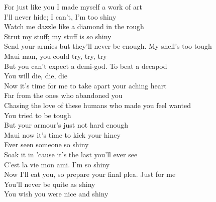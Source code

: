For just like you I made myself a work of art\\
I'll never hide; I can't, I'm too shiny\\
Watch me dazzle like a diamond in the rough\\
Strut my stuff; my stuff is so shiny\\
Send your armies but they'll never be enough. My shell's too tough\\
Maui man, you could try, try, try\\
But you can't expect a demi-god. To beat a decapod \\
You will die, die, die\\
Now it's time for me to take apart your aching heart\\
Far from the ones who abandoned you\\
Chasing the love of these humans who made you feel wanted\\
You tried to be tough\\
But your armour's just not hard enough\\
Maui now it's time to kick your hiney\\
Ever seen someone so shiny\\
Soak it in 'cause it's the last you'll ever see\\
C'est la vie mon ami. I'm so shiny\\
Now I'll eat you, so prepare your final plea. Just for me\\
You'll never be quite as shiny\\
You wish you were nice and shiny


